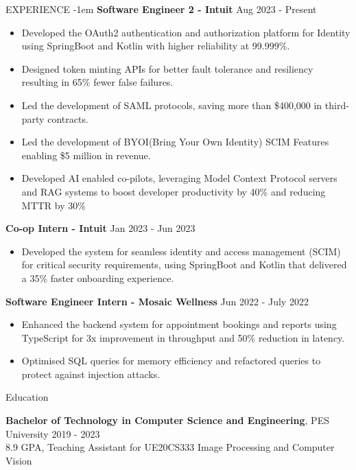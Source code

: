 \documentclass{resume} %
\begin{document}
\begin{rSection}{EXPERIENCE}
 \itemsep-1em
\textbf{Software Engineer 2 - Intuit} \vspace{-5pt} \hfill Aug 2023 - Present
 \begin{itemize}
 \itemsep-0.5em
     \item Developed the OAuth2 authentication and authorization platform for Identity using SpringBoot and Kotlin with higher reliability at 99.999\%. 
     \item Designed token minting APIs for better fault tolerance and resiliency resulting in 65\% fewer false failures.
     \item Led the development of SAML protocols, saving more than \$400,000 in third-party contracts. 
     \item Led the development of BYOI(Bring Your Own Identity) SCIM Features enabling \$5 million in revenue.
     \item Developed AI enabled co-pilots, leveraging Model Context Protocol servers and RAG systems to boost developer productivity by 40\% and reducing MTTR by 30\% 
 \end{itemize}
\textbf{Co-op Intern - Intuit} \vspace{-6pt} \hfill Jan 2023 - Jun 2023
 \begin{itemize}
  \itemsep-0.5em
     \item Developed the system for seamless identity and access management (SCIM) for critical security requirements, using SpringBoot and Kotlin that delivered a 35\% faster onboarding experience. 
 \end{itemize}
 \textbf{Software Engineer Intern - Mosaic Wellness} \vspace{-6pt} \hfill Jun 2022 - July 2022
 \begin{itemize}
  \itemsep-0.5em
     \item Enhanced the backend system for appointment bookings and reports using TypeScript for 3x improvement in throughput and 50\% reduction in latency.
     \item Optimised SQL queries for memory efficiency and refactored queries to protect against injection attacks.
 \end{itemize}
\end{rSection} 
\begin{rSection}{Education}

{\bf Bachelor of Technology in Computer Science and Engineering}, PES University \hfill {2019 - 2023} \\
{8.9 GPA, Teaching Assistant for UE20CS333 Image Processing and Computer Vision
}


\end{rSection}
\end{document}
